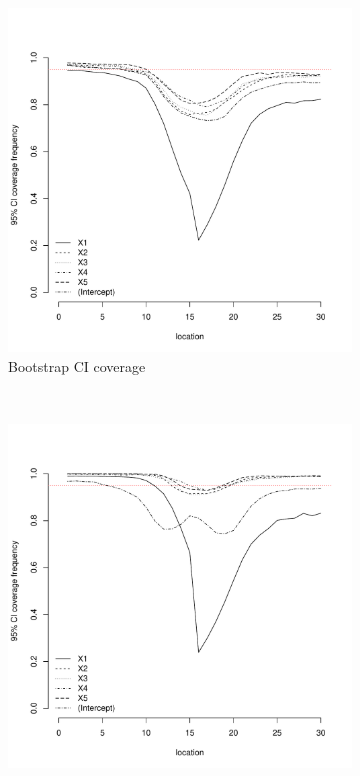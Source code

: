 \documentclass[authoryear, review, 11pt]{elsarticle}
\begin{document}
\begin{figure}
	\vspace{-30mm}
	\centering
	\begin{subfigure}[b]{0.45\textwidth}
	\centering
		\includegraphics[width=\textwidth]{../../figures/simulation/15.25.profile_bootstrap_coverage.pdf}
		\caption{Bootstrap CI coverage}
	\end{subfigure}%
	~ %
	\begin{subfigure}[b]{0.45\textwidth}
	\centering
		\includegraphics[width=\textwidth]{../../figures/simulation/15.25.profile_se_coverage.pdf}

\end{subfigure}
\end{figure}
\end{document}

